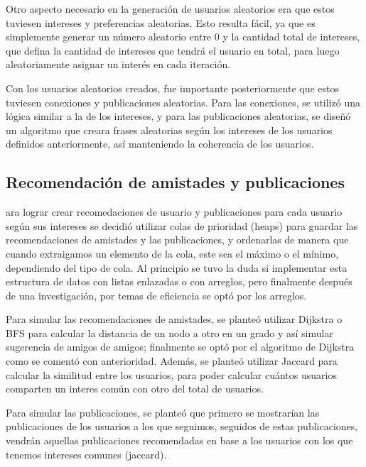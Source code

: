 \documentclass[9pt,letterpaper,onecolumn]{rho-class/rho}
\begin{document}
\vspace{0.5cm}

Otro aspecto necesario en la generación de usuarios aleatorios era que estos tuviesen intereses y preferencias aleatorias. Esto resulta fácil, ya que es  simplemente generar un número aleatorio entre 0 y la cantidad total de intereses, que defina la cantidad de intereses que tendrá el usuario en total, para luego aleatoriamente asignar un interés en cada iteración.

\vspace{0.5cm}

Con los usuarios aleatorios creados, fue importante posteriormente que estos tuviesen conexiones y publicaciones aleatorias. Para las conexiones, se utilizó una lógica similar a la de los intereses, y para las publicaciones aleatorias, se diseñó un algoritmo que creara frases aleatorias según los intereses de los usuarios definidos anteriormente, así manteniendo la coherencia de los usuarios.


\subsection{Recomendación de amistades y publicaciones}

ara lograr crear recomedaciones de usuario y publicaciones para cada usuario según sus intereses se decidió utilizar colas de prioridad (heaps) para guardar las recomendaciones de amistades y las publicaciones, y ordenarlas de manera que cuando extraigamos un elemento de la cola, este sea el máximo o el mínimo, dependiendo del tipo de cola. Al principio se tuvo la duda si implementar esta estructura de datos con listas enlazadas o con arreglos, pero finalmente después de una investigación, por temas de eficiencia se optó por los arreglos.

\vspace{0.5cm}

Para simular las recomendaciones de amistades, se planteó utilizar Dijkstra o BFS para calcular la distancia de un nodo a otro en un grado y así simular sugerencia de amigos de amigos; finalmente se optó por el algoritmo de Dijkstra como se comentó con anterioridad. Además, se planteó utilizar Jaccard para calcular la similitud entre los usuarios, para poder calcular cuántos usuarios comparten un interes común con otro del total de usuarios.

\vspace{0.5cm}

Para simular las publicaciones, se planteó que primero se mostrarían las publicaciones de los usuarios a los que seguimos, seguidos de estas publicaciones, vendrán aquellas publicaciones recomendadas en base a los usuarios con los que tenemos intereses comunes (jaccard).
\end{document}
